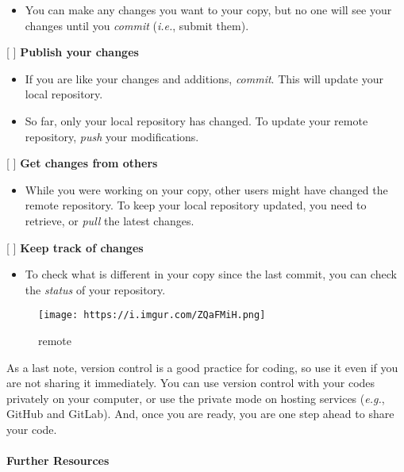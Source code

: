 \documentclass[
  letterpaper,
  DIV=11,
  numbers=noendperiod]{scrreport}
\let\oldparagraph\paragraph
\renewcommand{\paragraph}[1]{\oldparagraph{#1}\mbox{}}
\providecommand{\tightlist}{%
  \setlength{\itemsep}{0pt}\setlength{\parskip}{0pt}}\usepackage{longtable,booktabs,array}
\begin{document}
\begin{itemize}
\tightlist
\item
  You can make any changes you want to your copy, but no one will see
  your changes until you \emph{commit} (\emph{i.e.}, submit them).
\end{itemize}

{[} {]} \textbf{Publish your changes}

\begin{itemize}
\tightlist
\item
  If you are like your changes and additions, \emph{commit}. This will
  update your local repository.
\item
  So far, only your local repository has changed. To update your remote
  repository, \emph{push} your modifications.
\end{itemize}

{[} {]} \textbf{Get changes from others}

\begin{itemize}
\tightlist
\item
  While you were working on your copy, other users might have changed
  the remote repository. To keep your local repository updated, you need
  to retrieve, or \emph{pull} the latest changes.
\end{itemize}

{[} {]} \textbf{Keep track of changes}

\begin{itemize}
\tightlist
\item
  To check what is different in your copy since the last commit, you can
  check the \emph{status} of your repository.
\end{itemize}

\begin{figure}

{\centering \texttt{[image: https://i.imgur.com/ZQaFMiH.png]}

}

\caption{remote}

\end{figure}

As a last note, version control is a good practice for coding, so use it
even if you are not sharing it immediately. You can use version control
with your codes privately on your computer, or use the private mode on
hosting services (\emph{e.g.}, GitHub and GitLab). And, once you are
ready, you are one step ahead to share your code.

\hypertarget{further-resources}{%
\paragraph{Further Resources}\label{further-resources}}
\end{document}
